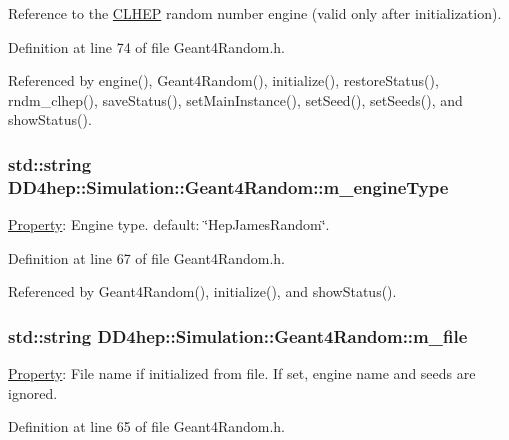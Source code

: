Reference to the \hyperlink{namespace_c_l_h_e_p}{CLHEP} random number engine (valid only after initialization). 

Definition at line 74 of file Geant4Random.h.

Referenced by engine(), Geant4Random(), initialize(), restoreStatus(), rndm\_\-clhep(), saveStatus(), setMainInstance(), setSeed(), setSeeds(), and showStatus().\hypertarget{class_d_d4hep_1_1_simulation_1_1_geant4_random_a288d4450519a05e0c2360c4994790cce}{
\subsubsection[{m\_\-engineType}]{\setlength{\rightskip}{0pt plus 5cm}std::string {\bf DD4hep::Simulation::Geant4Random::m\_\-engineType}}}
\label{class_d_d4hep_1_1_simulation_1_1_geant4_random_a288d4450519a05e0c2360c4994790cce}


\hyperlink{class_d_d4hep_1_1_property}{Property}: Engine type. default: \char`\"{}HepJamesRandom\char`\"{}. 

Definition at line 67 of file Geant4Random.h.

Referenced by Geant4Random(), initialize(), and showStatus().\hypertarget{class_d_d4hep_1_1_simulation_1_1_geant4_random_a0392ac65cdbecdf7aa9663d919246d66}{
\subsubsection[{m\_\-file}]{\setlength{\rightskip}{0pt plus 5cm}std::string {\bf DD4hep::Simulation::Geant4Random::m\_\-file}}}
\label{class_d_d4hep_1_1_simulation_1_1_geant4_random_a0392ac65cdbecdf7aa9663d919246d66}


\hyperlink{class_d_d4hep_1_1_property}{Property}: File name if initialized from file. If set, engine name and seeds are ignored. 

Definition at line 65 of file Geant4Random.h.

